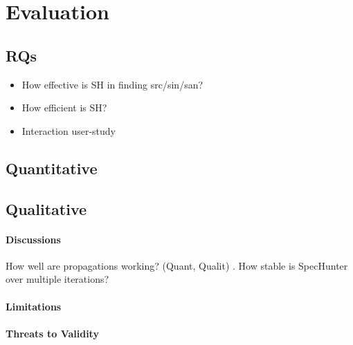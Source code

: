 \section{Evaluation}

\subsection{RQs}
\begin{itemize}
\item How effective is SH in finding src/sin/san?  %
\item How efficient is SH?
\item Interaction user-study %
\end{itemize}


\subsection{Quantitative}

\subsection{Qualitative}

\paragraph{Discussions}
How well are propagations working? (Quant, Qualit) .
How stable is SpecHunter over multiple iterations?
\paragraph{Limitations}

\paragraph{Threats to Validity}


